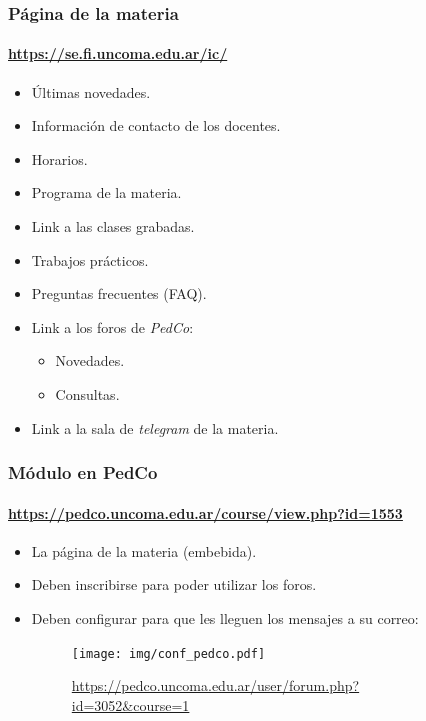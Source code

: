 \documentclass[11pt,a4paper,spanish]{beamer}
\begin{document}
\begin{frame}

    \frametitle{Página de la materia}
    \framesubtitle{\url{https://se.fi.uncoma.edu.ar/ic/}}

\begin{itemize}
    \item Últimas novedades.
    \item Información de contacto de los docentes.
    \item Horarios.
    \item Programa de la materia.
    \item Link a las clases grabadas.
    \item Trabajos prácticos.
    \item Preguntas frecuentes (FAQ).
    \item Link a los foros de \emph{PedCo}:
        \begin{itemize}
            \item Novedades.
            \item Consultas.
        \end{itemize}
    \item Link a la sala de \emph{telegram} de la materia.
\end{itemize}

\end{frame}

\begin{frame}

    \frametitle{Módulo en PedCo}
    \framesubtitle{\url{https://pedco.uncoma.edu.ar/course/view.php?id=1553}}

\begin{itemize}
    \item La página de la materia (embebida).
    \item Deben inscribirse para poder utilizar los foros.
    \item Deben configurar para que les lleguen los mensajes a su correo:
    \begin{figure}
        \texttt{[image: img/conf\_pedco.pdf]}
        \captionsetup{textfont=tiny,labelformat=empty}
        \caption{\url{https://pedco.uncoma.edu.ar/user/forum.php?id=3052&course=1}}
    \end{figure}
\end{itemize}

\end{frame}
\end{document}
